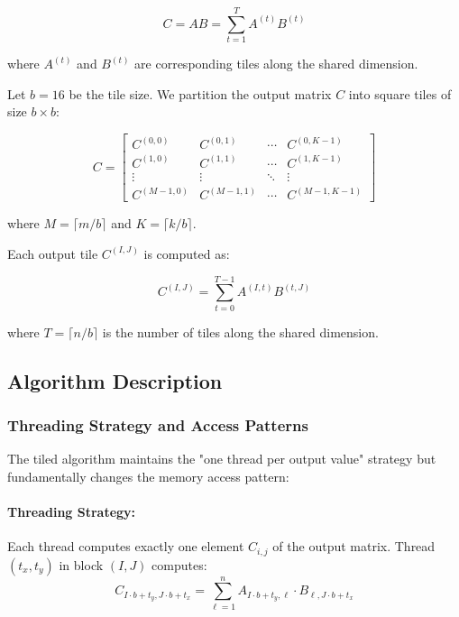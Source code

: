 \documentclass{amsbook}
\theoremstyle{definition}
\begin{document}
\begin{equation}
C = AB = \sum_{t=1}^{T} A^{(t)} B^{(t)}
\end{equation}

where $A^{(t)}$ and $B^{(t)}$ are corresponding tiles along the shared dimension.

Let $b = 16$ be the tile size. We partition the output matrix $C$ into square tiles of size $b \times b$:

\begin{equation}
C = \begin{bmatrix}
C^{(0,0)} & C^{(0,1)} & \cdots & C^{(0,K-1)} \\
C^{(1,0)} & C^{(1,1)} & \cdots & C^{(1,K-1)} \\
\vdots & \vdots & \ddots & \vdots \\
C^{(M-1,0)} & C^{(M-1,1)} & \cdots & C^{(M-1,K-1)}
\end{bmatrix}
\end{equation}

where $M = \lceil m/b \rceil$ and $K = \lceil k/b \rceil$.

Each output tile $C^{(I,J)}$ is computed as:

\begin{equation}
C^{(I,J)} = \sum_{t=0}^{T-1} A^{(I,t)} B^{(t,J)}
\end{equation}

where $T = \lceil n/b \rceil$ is the number of tiles along the shared dimension.

\subsection{Algorithm Description}

\subsubsection{Threading Strategy and Access Patterns}

The tiled algorithm maintains the "one thread per output value" strategy but fundamentally changes the memory access pattern:

\paragraph{Threading Strategy:} Each thread computes exactly one element $C_{i,j}$ of the output matrix. Thread $(t_x, t_y)$ in block $(I, J)$ computes:
\begin{equation}
C_{I \cdot b + t_y, J \cdot b + t_x} = \sum_{\ell=1}^{n} A_{I \cdot b + t_y, \ell} \cdot B_{\ell, J \cdot b + t_x}
\end{equation}
\end{document}
